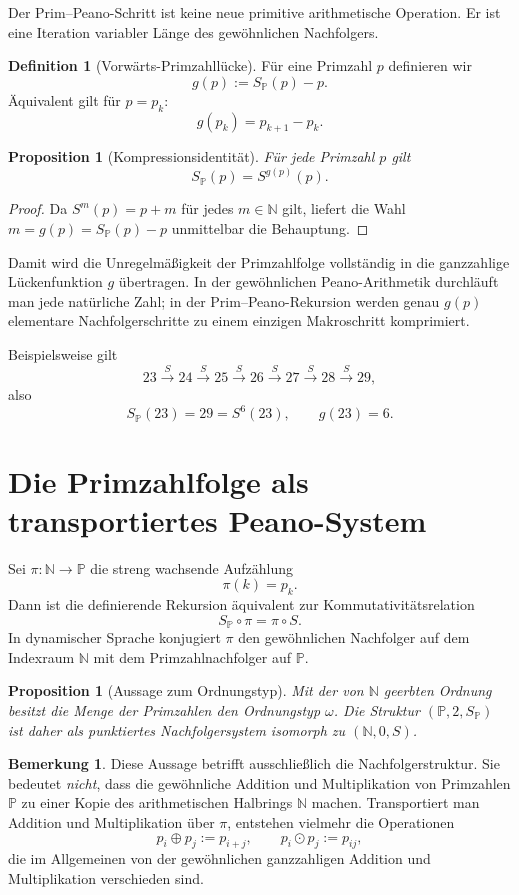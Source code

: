 \documentclass[11pt]{article}
\newtheorem{proposition}[theorem]{Proposition}
\theoremstyle{definition}
\newtheorem{definition}[theorem]{Definition}
\newtheorem{remark}[theorem]{Bemerkung}
\newcommand{\N}{\mathbb{N}}
\newcommand{\Pp}{\mathbb{P}}
\newcommand{\SP}{S_{\!\Pp}}
\newcommand{\gap}{g}
\begin{document}
Der Prim--Peano-Schritt ist keine neue primitive arithmetische Operation. Er ist eine Iteration variabler Länge des gewöhnlichen Nachfolgers.

\begin{definition}[Vorwärts-Primzahllücke]
Für eine Primzahl $p$ definieren wir
\[
\gap(p):=\SP(p)-p.
\]
Äquivalent gilt für $p=p_k$:
\[
\gap(p_k)=p_{k+1}-p_k.
\]
\end{definition}

\begin{proposition}[Kompressionsidentität]
Für jede Primzahl $p$ gilt
\[
\boxed{\SP(p)=S^{\gap(p)}(p).}
\]
\end{proposition}

\begin{proof}
Da $S^m(p)=p+m$ für jedes $m\in\N$ gilt, liefert die Wahl $m=\gap(p)=\SP(p)-p$ unmittelbar die Behauptung.
\end{proof}

Damit wird die Unregelmäßigkeit der Primzahlfolge vollständig in die ganzzahlige Lückenfunktion $\gap$ übertragen. In der gewöhnlichen Peano-Arithmetik durchläuft man jede natürliche Zahl; in der Prim--Peano-Rekursion werden genau $\gap(p)$ elementare Nachfolgerschritte zu einem einzigen Makroschritt komprimiert.

Beispielsweise gilt
\[
23\xrightarrow{S}24\xrightarrow{S}25\xrightarrow{S}26\xrightarrow{S}27\xrightarrow{S}28\xrightarrow{S}29,
\]
also
\[
\SP(23)=29=S^6(23),\qquad \gap(23)=6.
\]

\section{Die Primzahlfolge als transportiertes Peano-System}

Sei $\pi:\N\to\Pp$ die streng wachsende Aufzählung
\[
\pi(k)=p_k.
\]
Dann ist die definierende Rekursion äquivalent zur Kommutativitätsrelation
\[
\boxed{\SP\circ\pi=\pi\circ S.}
\]
In dynamischer Sprache konjugiert $\pi$ den gewöhnlichen Nachfolger auf dem Indexraum $\N$ mit dem Primzahlnachfolger auf $\Pp$.

\begin{proposition}[Aussage zum Ordnungstyp]
Mit der von $\N$ geerbten Ordnung besitzt die Menge der Primzahlen den Ordnungstyp $\omega$. Die Struktur $(\Pp,2,\SP)$ ist daher als punktiertes Nachfolgersystem isomorph zu $(\N,0,S)$.
\end{proposition}

\begin{remark}
Diese Aussage betrifft ausschließlich die Nachfolgerstruktur. Sie bedeutet \emph{nicht}, dass die gewöhnliche Addition und Multiplikation von Primzahlen $\Pp$ zu einer Kopie des arithmetischen Halbrings $\N$ machen. Transportiert man Addition und Multiplikation über $\pi$, entstehen vielmehr die Operationen
\[
p_i\oplus p_j:=p_{i+j},\qquad p_i\odot p_j:=p_{ij},
\]
die im Allgemeinen von der gewöhnlichen ganzzahligen Addition und Multiplikation verschieden sind.
\end{remark}
\end{document}
